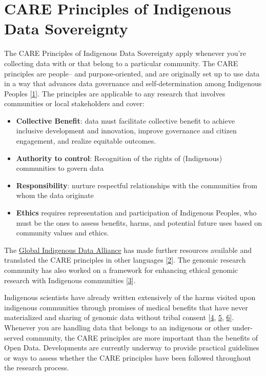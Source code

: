 \documentclass[
  letterpaper,
  DIV=11,
  numbers=noendperiod]{scrreport}
\providecommand{\tightlist}{%
  \setlength{\itemsep}{0pt}\setlength{\parskip}{0pt}}\usepackage{longtable,booktabs,array}
\begin{document}
\hypertarget{care-principles-of-indigenous-data-sovereignty}{%
\section{CARE Principles of Indigenous Data
Sovereignty}\label{care-principles-of-indigenous-data-sovereignty}}

The CARE Principles of Indigenous Data Sovereignty apply whenever you're
collecting data with or that belong to a particular community. The CARE
principles are people-- and purpose-oriented, and are originally set up
to use data in a way that advances data governance and
self-determination among Indigenous Peoples
{[}\href{http://doi.org/10.5334/dsj-2020-043}{1}{]}. The principles are
applicable to any research that involves communities or local
stakeholders and cover:

\begin{itemize}
\tightlist
\item
  \textbf{Collective Benefit}: data must facilitate collective benefit
  to achieve inclusive development and innovation, improve governance
  and citizen engagement, and realize equitable outcomes.
\item
  \textbf{Authority to control}: Recognition of the rights of
  (Indigenous) communities to govern data
\item
  \textbf{Responsibility}: nurture respectful relationships with the
  communities from whom the data originate
\item
  \textbf{Ethics} requires representation and participation of
  Indigenous Peoples, who must be the ones to assess benefits, harms,
  and potential future uses based on community values and ethics.
\end{itemize}

The \href{https://www.gida-global.org/care}{Global Indigenous Data
Alliance} has made further resources available and translated the CARE
principles in other languages
{[}\href{https://www.gida-global.org/care}{2}{]}. The genomic research
community has also worked on a framework for enhancing ethical genomic
research with Indigenous communities
{[}\href{https://doi.org/10.1038/s41467-018-05188-3}{3}{]}.

Indigenous scientists have already written extensively of the harms
visited upon indigenous communities through promises of medical benefits
that have never materialized and sharing of genomic data without tribal
consent {[}\href{https://doi.org/10.1038/s41576-019-0161-z}{4},
\href{https://doi.org/10.1080/15265161.2021.1891347}{5},
\href{https://doi.org/10.1038/d41586-021-00758-w}{6}{]}. Whenever you
are handling data that belongs to an indigenous or other under-served
community, the CARE principles are more important than the benefits of
Open Data. Developments are currently underway to provide practical
guidelines or ways to assess whether the CARE principles have been
followed throughout the research process.
\end{document}
